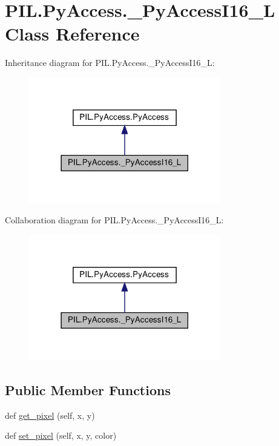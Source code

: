\hypertarget{classPIL_1_1PyAccess_1_1__PyAccessI16__L}{}\section{P\+I\+L.\+Py\+Access.\+\_\+\+Py\+Access\+I16\+\_\+L Class Reference}
\label{classPIL_1_1PyAccess_1_1__PyAccessI16__L}


Inheritance diagram for P\+I\+L.\+Py\+Access.\+\_\+\+Py\+Access\+I16\+\_\+L\+:
\nopagebreak
\begin{figure}[H]
\begin{center}
\leavevmode
\includegraphics[width=237pt]{classPIL_1_1PyAccess_1_1__PyAccessI16__L__inherit__graph}
\end{center}
\end{figure}


Collaboration diagram for P\+I\+L.\+Py\+Access.\+\_\+\+Py\+Access\+I16\+\_\+L\+:
\nopagebreak
\begin{figure}[H]
\begin{center}
\leavevmode
\includegraphics[width=237pt]{classPIL_1_1PyAccess_1_1__PyAccessI16__L__coll__graph}
\end{center}
\end{figure}
\subsection*{Public Member Functions}
\begin{DoxyCompactItemize}
\item 
def \hyperlink{classPIL_1_1PyAccess_1_1__PyAccessI16__L_a441834dd33cc436edff9a73be5868231}{get\+\_\+pixel} (self, x, y)
\item 
def \hyperlink{classPIL_1_1PyAccess_1_1__PyAccessI16__L_a0a82e68731c05361a77025bee2f7d3b1}{set\+\_\+pixel} (self, x, y, color)
\end{DoxyCompactItemize}
